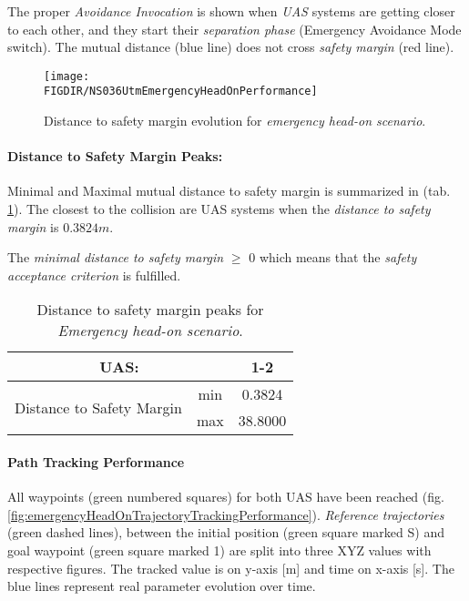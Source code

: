 The proper \emph{Avoidance Invocation} is shown when \emph{UAS} systems are getting closer to each other, and they start their \emph{separation phase} (Emergency Avoidance Mode switch). The mutual distance (blue line) does not cross \emph{safety margin} (red line).

\begin{figure}[H]
    \centering
    \texttt{[image: \\FIGDIR/NS036UtmEmergencyHeadOnPerformance]} 
    \caption{Distance to safety margin evolution for \emph{emergency head-on scenario}.}
    \label{fig:testCaseHeadOnAvoidancePerformance}
\end{figure}


\paragraph{Distance to Safety Margin Peaks:} Minimal and Maximal mutual distance to safety margin is summarized in (tab. \ref{tab:testCaseEmergencyHeadOnSafetyMarginDistances}). The closest to the collision are UAS systems when the \emph{distance to safety margin} is $0.3824 m$.

The \emph{minimal distance to safety margin} $\ge$ $0$ which means that the \emph{safety acceptance criterion} is fulfilled.


\begin{table}[H]
    \centering
    \begin{tabular}{c|c||c}
    \multicolumn{2}{c||}{UAS:} & 1-2 \\\hline\hline
    \multirow{2}{*}{Distance to Safety Margin} & min & 0.3824 \\\cline{2-3}
                                            & max & 38.8000 \\
    \end{tabular}
    \caption{Distance to safety margin peaks for \emph{Emergency head-on scenario}.}
    \label{tab:testCaseEmergencyHeadOnSafetyMarginDistances}
\end{table}

\paragraph{Path Tracking Performance} All waypoints (green numbered squares) for both UAS have been reached (fig. \ref{fig:emergencyHeadOnTrajectoryTrackingPerformance}). \emph{Reference trajectories} (green dashed lines), between the initial position (green square marked S) and goal waypoint (green square marked 1) are split into three XYZ values with respective figures. The tracked value is on y-axis [m] and time on x-axis [s]. The blue lines represent real parameter evolution over time.

